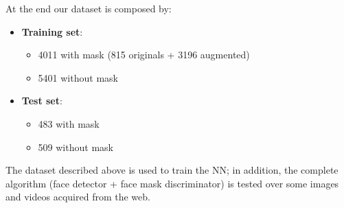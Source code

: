 \documentclass[10pt,twocolumn,letterpaper]{article}
\begin{document}
At the end our dataset is composed by:
\begin{itemize}
    \item \textbf{Training set}:
    \begin{itemize}
        \item 4011 with mask (815 originals + 3196 augmented)   \item 5401 without mask
    \end{itemize}
    \item \textbf{Test set}:
    \begin{itemize}
        \item 483 with mask
        \item 509 without mask
    \end{itemize} 
\end{itemize}

The dataset described above is used to train the NN; in addition, the complete algorithm (face detector + face mask discriminator) is tested over some images and videos acquired from the web.

\end{document}
